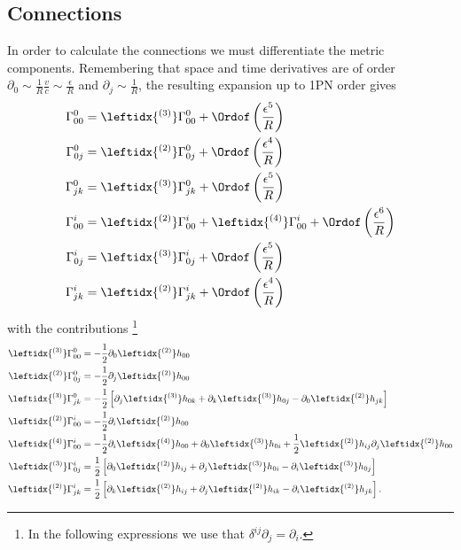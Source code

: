 \subsection{Connections}
In order to calculate the connections we must differentiate the metric components. Remembering that  space and time derivatives are of order $\partial_0 \sim  \frac{1}{R} \frac{v}{c} \sim \frac{\epsilon}{R} $ and $\partial_j \sim  \frac{1}{R}$, the resulting expansion up to 1PN order gives
\begin{subequations} \label{eq:PNConnections}
\begin{align}
\Gamma ^0_{00} &=  \leftidx{^{(3)}}\Gamma ^0_{00} + \Ordof \left( \frac{\epsilon ^5}{R} \right) \\
\Gamma ^0_{0j} &=  \leftidx{^{(2)}}\Gamma ^0_{0j} + \Ordof \left( \frac{\epsilon ^4}{R} \right) \\
\Gamma ^0_{jk} &=   \leftidx{^{(3)}}\Gamma ^0_{jk} + \Ordof \left( \frac{\epsilon ^5}{R} \right) \\
\Gamma ^i_{00} &=  \leftidx{^{(2)}}\Gamma ^i_{00} + \leftidx{^{(4)}}\Gamma ^i_{00} + \Ordof \left( \frac{\epsilon ^6}{R} \right) \\
\Gamma ^i_{0j} &=  \leftidx{^{(3)}}\Gamma ^i_{0j} + \Ordof \left( \frac{\epsilon ^5}{R} \right) \\
\Gamma ^i_{jk} &= \leftidx{^{(2)}}\Gamma ^i_{jk} + \Ordof \left( \frac{\epsilon ^4}{R} \right) 
\end{align}
\end{subequations}
with the contributions \footnote{In the following expressions we use that $\delta^{ij} \partial_j = \partial_i$.} 
\begin{subequations} \label{eq:PNConnectionsComponents}
\begin{align}
\leftidx{^{(3)}}\Gamma ^0_{00} &= - \frac{1}{2} \partial _0 \leftidx{^{(2)}}h_{00} \\
\leftidx{^{(2)}}\Gamma ^0_{0j} &= - \frac{1}{2} \partial _j \leftidx{^{(2)}}h_{00} \\
\leftidx{^{(3)}}\Gamma ^0_{jk} &= - \frac{1}{2} \left[ \partial _j \leftidx{^{(3)}}h_{0k} + \partial _k \leftidx{^{(3)}}h_{0j} - \partial _0 \leftidx{^{(2)}}h_{jk} \right] \\
\leftidx{^{(2)}}\Gamma ^i_{00} &= - \frac{1}{2} \partial _i \leftidx{^{(2)}}h_{00} \\
\leftidx{^{(4)}}\Gamma ^i_{00} &= - \frac{1}{2} \partial _i \leftidx{^{(4)}}h_{00} + \partial _0 \leftidx{^{(3)}}h_{0i} + \frac{1}{2} \leftidx{^{(2)}}h_{ij}  \partial _j \leftidx{^{(2)}}h_{00}\\
\leftidx{^{(3)}}\Gamma ^i_{0j} &=  \frac{1}{2} \left[  \partial _0 \leftidx{^{(2)}}h_{ij} + \partial _j \leftidx{^{(3)}}h_{0i} - \partial _i \leftidx{^{(3)}}h_{0j} \right]\\
\leftidx{^{(2)}}\Gamma ^i_{jk} &= \frac{1}{2} \left[ \partial _k \leftidx{^{(2)}}h_{ij} + \partial _j \leftidx{^{(2)}}h_{ik} - \partial _i \leftidx{^{(2)}}h_{jk} \right].
\end{align}
\end{subequations}

